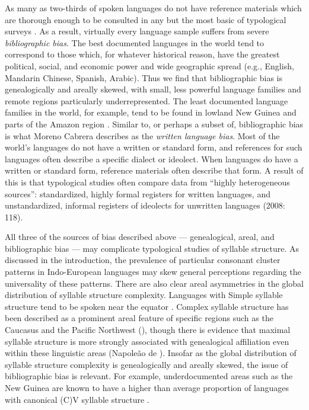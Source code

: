   As many as two-thirds of spoken languages do not have reference materials which are thorough enough to be consulted in any but the most basic of typological surveys \citep[106]{Bakker2011}. As a result, virtually every language sample suffers from severe \textit{bibliographic bias}. The best documented languages in the world tend to correspond to those which, for whatever historical reason, have the greatest political, social, and economic power and wide geographic spread (e.g., English, Mandarin Chinese, Spanish, Arabic). Thus we find that bibliographic bias is genealogically and areally skewed, with small, less powerful language families and remote regions particularly underrepresented. The least documented language families in the world, for example, tend to be found in lowland New Guinea and parts of the Amazon region \citep{Hammarström2010}. Similar to, or perhaps a subset of, bibliographic bias is what Moreno Cabrera describes as the \textit{written language bias}. Most of the world’s languages do not have a written or standard form, and references for such languages often describe a specific dialect or ideolect. When languages do have a written or standard form, reference materials often describe that form. A result of this is that typological studies often compare data from “highly heterogeneous sources”: standardized, highly formal registers for written languages, and unstandardized, informal registers of ideolects for unwritten languages (2008: 118).

  All three of the sources of bias described above — genealogical, areal, and bibliographic bias — may complicate typological studies of syllable structure. As discussed in the introduction, the prevalence of particular consonant cluster patterns in Indo-European languages may skew general perceptions regarding the universality of these patterns. There are also clear areal asymmetries in the global distribution of syllable structure complexity. Languages with Simple syllable structure tend to be spoken near the equator \citep{Maddieson2013a}. Complex syllable structure has been described as a prominent areal feature of specific regions such as the Caucasus \citep{Chirikba2008} and the Pacific Northwest (\citealt{ThompsonKinkade1990}), though there is evidence that maximal syllable structure is more strongly associated with genealogical affiliation even within these linguistic areas (Napoleão de \citealt{Souza2017}). Insofar as the global distribution of syllable structure complexity is genealogically and areally skewed, the issue of bibliographic bias is relevant. For example, underdocumented areas such as the New Guinea are known to have a higher than average proportion of languages with canonical (C)V syllable structure \citep{Maddieson2013a}.

